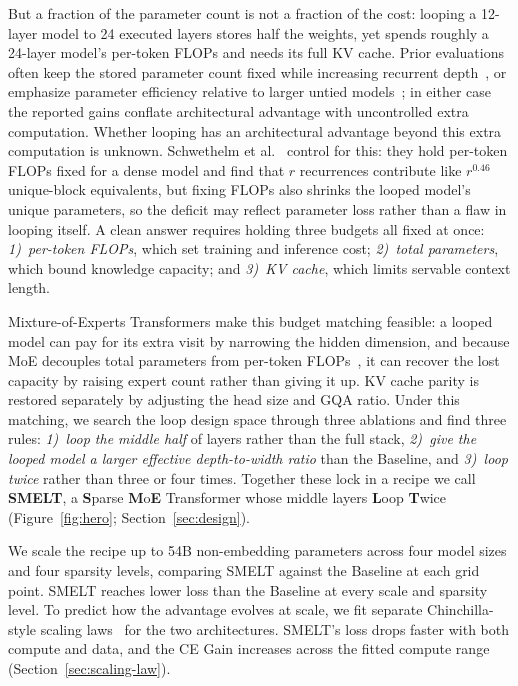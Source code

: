 \documentclass[]{bytedance_seed}
\newcommand{\archname}{SMELT}
\theoremstyle{definition}
\theoremstyle{remark}
\begin{document}
%
%
But a fraction of the parameter count is not a fraction of the cost: looping a 12-layer model to 24 executed layers stores half the weights, yet spends roughly a 24-layer model's per-token FLOPs and needs its full KV cache.
%
Prior evaluations often keep the stored parameter count fixed while increasing recurrent depth~\cite{geiping2025scaling,prairie2026parcae}, or emphasize parameter efficiency relative to larger untied models~\cite{yang2024looped,zhu2025scaling}; in either case the reported gains conflate architectural advantage with uncontrolled extra computation.
%
Whether looping has an architectural advantage beyond this extra computation is unknown.
%
Schwethelm et al.~\cite{schwethelm2026recurrence} control for this: they hold per-token FLOPs fixed for a dense model and find that $r$ recurrences contribute like $r^{0.46}$ unique-block equivalents, but fixing FLOPs also shrinks the looped model's unique parameters, so the deficit may reflect parameter loss rather than a flaw in looping itself.
%
A clean answer requires holding three budgets all fixed at once: \textit{1)~per-token FLOPs}, which set training and inference cost; \textit{2)~total parameters}, which bound knowledge capacity; and \textit{3)~KV cache}, which limits servable context length.

%
%
Mixture-of-Experts Transformers make this budget matching feasible: a looped model can pay for its extra visit by narrowing the hidden dimension, and because MoE decouples total parameters from per-token FLOPs~\cite{fedus2022switch,shazeer2017outrageously}, it can recover the lost capacity by raising expert count rather than giving it up. KV cache parity is restored separately by adjusting the head size and GQA ratio.
%
Under this matching, we search the loop design space through three ablations and find three rules: \textit{1)~loop the middle half} of layers rather than the full stack, \textit{2)~give the looped model a larger effective depth-to-width ratio} than the Baseline, and \textit{3)~loop twice} rather than three or four times.
%
Together these lock in a recipe we call \textbf{\archname{}}, a \textbf{S}parse \textbf{M}o\textbf{E} Transformer whose middle layers \textbf{L}oop \textbf{T}wice (Figure~\ref{fig:hero}; Section~\ref{sec:design}).

We scale the recipe up to 54B non-embedding parameters across four model sizes and four sparsity levels, comparing \archname{} against the Baseline at each grid point.
%
%
\archname{} reaches lower loss than the Baseline at every scale and sparsity level.
%
To predict how the advantage evolves at scale, we fit separate Chinchilla-style scaling laws~\cite{hoffmann2022training} for the two architectures.
%
\archname{}'s loss drops faster with both compute and data, and the CE Gain increases across the fitted compute range (Section~\ref{sec:scaling-law}).
\end{document}
